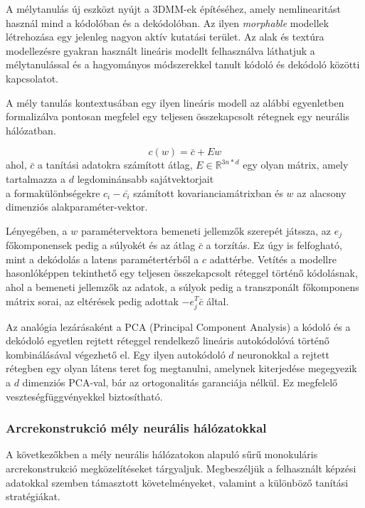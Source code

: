 \documentclass[12pt,a4]{article}
\begin{document}
	
	A mélytanulás új eszközt nyújt a 3DMM-ek építéséhez, amely nemlinearitást használ mind a kódolóban és a dekódolóban. Az ilyen \textit{morphable} modellek létrehozása egy jelenleg nagyon aktív kutatási terület.
	Az alak és textúra modellezésre gyakran használt lineáris modellt felhasználva láthatjuk a mélytanulással és a hagyományos módszerekkel tanult kódoló és dekódoló közötti kapcsolatot.
	
	
	A mély tanulás kontextusában egy ilyen lineáris modell
	az alábbi egyenletben formalizálva pontosan megfelel egy teljesen összekapcsolt rétegnek egy
	neurális hálózatban.
	
	\begin{mdframed}
	\begin{equation}
		c(w) = \bar{c} + Ew 
	\end{equation}
		  ahol, $\bar{c}$ a tanítási adatokra számított átlag, $E \in \mathbb{R}^{3n*d}$ egy olyan mátrix, amely tartalmazza a $d$ legdominánsabb sajátvektorjait \\
		  a formakülönbségekre $c_i - \bar{c_i}$ számított kovarianciamátrixban és
		$w$ az alacsony dimenziós alakparaméter-vektor.
	\end{mdframed}
	
	Lényegében, a $w$ paramétervektora bemeneti jellemzők szerepét játssza, az $e_j$ főkomponensek pedig a súlyokét és az átlag $\bar{c}$ a torzítás.
	Ez úgy is felfogható, mint a dekódolás a latens paramétertérből a $c$ adattérbe. Vetítés a modellre
	hasonlóképpen tekinthető egy teljesen összekapcsolt réteggel történő kódolásnak,
	ahol a bemeneti jellemzők az adatok, a súlyok pedig a transzponált főkomponens mátrix sorai, az eltérések pedig adottak $-e^{T}_{j}\bar{c}$ által.
	
	
	 Az analógia lezárásaként a PCA (Principal Component Analysis) a kódoló és a dekódoló egyetlen rejtett réteggel rendelkező lineáris autokódolóvá történő kombinálásával végezhető el.
	Egy ilyen autokódoló $d$ neuronokkal a
	rejtett rétegben egy olyan látens teret fog megtanulni, amelynek kiterjedése megegyezik a $d$
	dimenziós PCA-val, bár az ortogonalitás garanciája nélkül.
	Ez megfelelő veszteségfüggvényekkel biztosítható.
	
	\subsubsection{Arcrekonstrukció mély neurális hálózatokkal}
	
	 A következőkben a mély neurális hálózatokon alapuló sűrű monokuláris arcrekonstrukció megközelítéseket tárgyaljuk. Megbeszéljük
	a felhasznált képzési adatokkal szemben támasztott követelményeket, valamint a különböző tanítási
	stratégiákat. 
	
\end{document}
